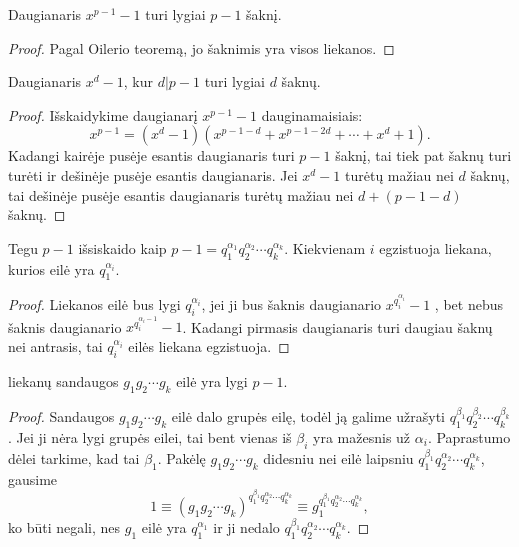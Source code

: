 \begin{teig}
  Daugianaris $x^{p-1} - 1$ turi lygiai $p-1$ šaknį.
\end{teig}

\begin{proof}
  Pagal Oilerio teoremą, jo šaknimis yra visos liekanos.
\end{proof}

\begin{teig}
  Daugianaris $x^d - 1$, kur $d|p-1$ turi lygiai $d$ šaknų.
\end{teig}

\begin{proof}
  Išskaidykime daugianarį $x^{p-1} - 1$ dauginamaisiais:
  $$x^{p-1} = (x^{d}-1)(x^{p-1-d} + x^{p-1-2d} + \cdots + x^{d} + 1).$$
  Kadangi kairėje pusėje esantis daugianaris turi $p-1$ šaknį, tai tiek pat
  šaknų turi turėti ir dešinėje pusėje esantis daugianaris. Jei $x^d -1$
  turėtų mažiau nei $d$ šaknų, tai dešinėje pusėje esantis daugianaris
  turėtų mažiau nei $d + (p-1-d)$ šaknų.
\end{proof}

\begin{teig}
  Tegu $p-1$ išsiskaido kaip $p-1=q_1^{\alpha_1} q_2^{\alpha_2} \cdots
  q_k^{\alpha_k}$. Kiekvienam $i$ egzistuoja liekana, kurios eilė yra
  $q_1^{\alpha_i}$.
\end{teig}

\begin{proof}
  Liekanos eilė bus lygi $q_i^{\alpha_i}$, jei ji bus šaknis daugianario
  $x^{q_i^{\alpha_i}} - 1$ , bet nebus šaknis daugianario
  $x^{q_i^{\alpha_i -1}} - 1$. Kadangi pirmasis daugianaris turi daugiau
  šaknų nei antrasis, tai $q_i^{\alpha_i}$ eilės liekana egzistuoja.
\end{proof}

\begin{teig}
  liekanų sandaugos $g_1 g_2 \cdots g_k$ eilė yra lygi $p-1$.
\end{teig}

\begin{proof}
  Sandaugos $g_1 g_2 \cdots g_k$ eilė dalo grupės eilę, todėl ją galime
  užrašyti $q_1^{\beta_1} q_2^{\beta_2}\cdots q_k^{\beta_k}$. Jei ji nėra
  lygi grupės eilei, tai bent vienas iš $\beta_i$ yra mažesnis už
  $\alpha_i$.  Paprastumo dėlei tarkime, kad tai $\beta_1$.  Pakėlę $g_1
  g_2 \cdots g_k$ didesniu nei eilė laipsniu $q_1^{\beta_1}
  q_2^{\alpha_2}\cdots q_k^{\alpha_k}$, gausime 
  $$1\equiv (g_1 g_2 \cdots g_k)^{q_1^{\beta_1} q_2^{\alpha_2}\cdots
  q_k^{\alpha_k}}\equiv g_1^{q_1^{\beta_1} q_2^{\alpha_2}\cdots
  q_k^{\alpha_k}},$$
  ko būti negali, nes $g_1$ eilė yra $q_1^{\alpha_1}$ ir ji nedalo
  $q_1^{\beta_1} q_2^{\alpha_2}\cdots q_k^{\alpha_k}$.
\end{proof}


